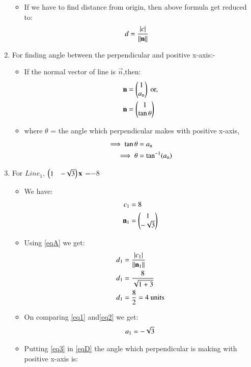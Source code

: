 \documentclass[journal,12pt,twocolumn]{IEEEtran}
\begin{document}
\begin{enumerate}
\begin{itemize}
\item If we have to find distance from origin, then above formula get reduced to:
\begin{align}
d&=\frac { \left| c \right| }{\lVert\mathbf{n}\rVert}\label{eqA}
\end{align}
\end{itemize}
\item For finding angle between the perpendicular and positive x-axis:-
\begin{itemize}
\item If the normal vector of line is $\vec{n}$,then:
\begin{align}
 \mathbf{n}&=\begin{pmatrix}1\\a\textsubscript{n}\end{pmatrix} \text{ or,} \label{eq1} 
 \\
 \mathbf{n}&=\begin{pmatrix}1\\ \tan\theta\end{pmatrix}   
\end{align}
\item where $\theta$ = the angle which perpendicular makes with positive x-axis,
\begin{align}
\implies\tan\theta&= a\textsubscript{n}
  \\
 \implies \theta &= \tan^{-1}( a\textsubscript{n})\label{eqD}
\end{align}
\end{itemize}
\item For $Line_1$, $\begin{pmatrix}1&-\sqrt{3}\end{pmatrix}\mathbf{x}$ =$-8$
\begin{itemize}
\item We have:
\begin{align}
 c\textsubscript{1}&=8 
 \\
 {\mathbf{n\textsubscript{1}}}&=\begin{pmatrix}1\\-\sqrt{3}\end{pmatrix} \label{eq2}  
\end{align}
\item Using \eqref{eqA} we get:
\begin{align}
d\textsubscript{1}&=\frac { \left| c\textsubscript{1} \right| }{\lVert\mathbf{n\textsubscript{1}}\rVert}
\\
d\textsubscript{1}&=\frac{8}{\sqrt{1+3}} 
\\
d\textsubscript{1}&=\frac{8}{2}=4\text{ units}
\end{align}
\item On comparing \eqref{eq1} and\eqref{eq2} we get:
\begin{align}
 a\textsubscript{1}=-\sqrt{3}  \label{eq3} 
\end{align}
\item Putting \eqref{eq3} in \eqref{eqD} the angle which perpendicular is making with positive x-axis is:

\end{itemize}
\end{enumerate}
\end{document}
